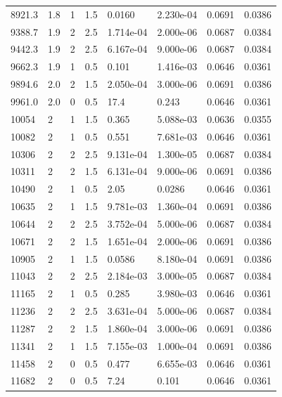 \documentclass[preview]{standalone}
\begin{document}
{{{\begin{tabular}{L{1.2cm}C{1.2cm} C{0.3cm}C{0.5cm} C{1.4cm}C{1.4cm} C{1.4cm}C{1.4cm}}
  8921.3  &   1.8  & 1     & 1.5 &  0.0160  & 2.230e-04  & 0.0691 &  0.0386   \\ 
  9388.7  &   1.9  & 2     & 2.5 &  1.714e-04  & 2.000e-06  & 0.0687 &  0.0384   \\ 
  9442.3  &   1.9  & 2     & 2.5 &  6.167e-04  & 9.000e-06  & 0.0687 &  0.0384   \\ 
  9662.3  &   1.9  & 1     & 0.5 &  0.101  & 1.416e-03  & 0.0646 &  0.0361   \\ 
  9894.6  &   2.0  & 2     & 1.5 &  2.050e-04  & 3.000e-06  & 0.0691 &  0.0386   \\ 
  9961.0  &   2.0  & 0     & 0.5 &  17.4  & 0.243  & 0.0646 &  0.0361   \\ 
  10054  &     2  & 1     & 1.5 &  0.365  & 5.088e-03  & 0.0636 &  0.0355   \\ 
  10082  &     2  & 1     & 0.5 &  0.551  & 7.681e-03  & 0.0646 &  0.0361   \\ 
  10306  &     2  & 2     & 2.5 &  9.131e-04  & 1.300e-05  & 0.0687 &  0.0384   \\ 
  10311  &     2  & 2     & 1.5 &  6.131e-04  & 9.000e-06  & 0.0691 &  0.0386   \\ 
  10490  &     2  & 1     & 0.5 &  2.05  & 0.0286  & 0.0646 &  0.0361   \\ 
  10635  &     2  & 1     & 1.5 &  9.781e-03  & 1.360e-04  & 0.0691 &  0.0386   \\ 
  10644  &     2  & 2     & 2.5 &  3.752e-04  & 5.000e-06  & 0.0687 &  0.0384   \\ 
  10671  &     2  & 2     & 1.5 &  1.651e-04  & 2.000e-06  & 0.0691 &  0.0386   \\ 
  10905  &     2  & 1     & 1.5 &  0.0586  & 8.180e-04  & 0.0691 &  0.0386   \\ 
  11043  &     2  & 2     & 2.5 &  2.184e-03  & 3.000e-05  & 0.0687 &  0.0384   \\ 
  11165  &     2  & 1     & 0.5 &  0.285  & 3.980e-03  & 0.0646 &  0.0361   \\ 
  11236  &     2  & 2     & 2.5 &  3.631e-04  & 5.000e-06  & 0.0687 &  0.0384   \\ 
  11287  &     2  & 2     & 1.5 &  1.860e-04  & 3.000e-06  & 0.0691 &  0.0386   \\ 
  11341  &     2  & 1     & 1.5 &  7.155e-03  & 1.000e-04  & 0.0691 &  0.0386   \\ 
  11458  &     2  & 0     & 0.5 &  0.477  & 6.655e-03  & 0.0646 &  0.0361   \\ 
  11682  &     2  & 0     & 0.5 &  7.24  & 0.101  & 0.0646 &  0.0361   \\ 

\end{tabular}}}}
\end{document}
